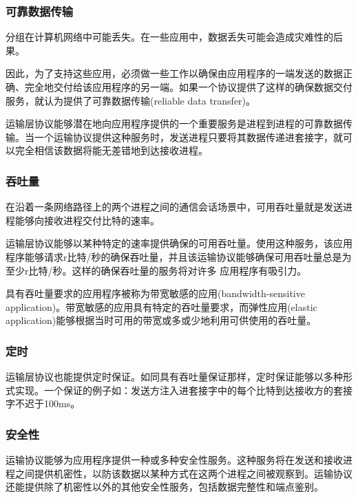 \subsubsection{可靠数据传输}

    分组在计算机网络中可能丢失。在一些应用中，数据丢失可能会造成灾难性的后果。

    因此，为了支持这些应用，必须做一些工作以确保由应用程序的一端发送的数据正确、完全地交付给该应用程序的另一端。如果一个协议提供了这样的确保数据交付服务，就认为提供了可靠数据传输(reliable data transfer)。

    运输层协议能够潜在地向应用程序提供的一个重要服务是进程到进程的可靠数据传输。当一个运输协议提供这种服务时，发送进程只要将其数据传递进套接字，就可以完全相信该数据将能无差错地到达接收进程。

\subsubsection{吞吐量}

    在沿着一条网络路径上的两个进程之间的通信会话场景中，可用吞吐量就是发送进程能够向接收进程交付比特的速率。

    运输层协议能够以某种特定的速率提供确保的可用吞吐量。使用这种服务，该应用程序能够请求r比特/秒的确保吞吐量，并且该运输协议能够确保可用吞吐量总是为至少r比特/秒。这样的确保吞吐量的服务将对许多 应用程序有吸引力。

    具有吞吐量要求的应用程序被称为带宽敏感的应用(bandwidth-sensitive application)。带宽敏感的应用具有特定的吞吐量要求，而弹性应用(elastic application)能够根据当时可用的带宽或多或少地利用可供使用的吞吐量。

\subsubsection{定时}

    运输层协议也能提供定时保证。如同具有吞吐量保证那样，定时保证能够以多种形式实现。一个保证的例子如：发送方注入进套接字中的每个比特到达接收方的套接字不迟于100ms。

\subsubsection{安全性}
    
    运输协议能够为应用程序提供一种或多种安全性服务。这种服务将在发送和接收进程之间提供机密性，以防该数据以某种方式在这两个进程之间被观察到。运输协议还能提供除了机密性以外的其他安全性服务，包括数据完整性和端点鉴别。

